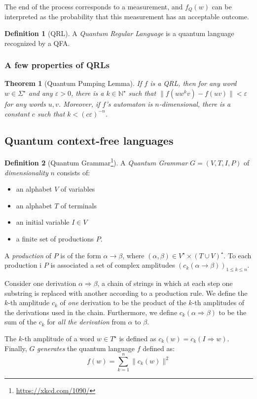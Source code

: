 \documentclass[12pt,a4paper]{article}
\theoremstyle{plain}
\newtheorem*{theorem}{Theorem}
\theoremstyle{definition}
\newtheorem*{definition}{Definition}
\begin{document}
The end of the process corresponds to a measurement, and $f_Q(w)$ can be interpreted as the probability that this measurement has an acceptable outcome. 

\begin{definition}[QRL]
    A \emph{Quantum Regular Language} is a quantum language recognized by a QFA.
\end{definition}

\subsubsection{A few properties of QRLs}
\begin{theorem}[Quantum Pumping Lemma]
    If $f$ is a QRL, then for any word $w\in\Sigma^\star$ and any $\varepsilon > 0$, there is a $k\in \mathbb{N}^\star$ such that $\|f(uw^kv) - f(uv)\| < \varepsilon$ for any words $u, v$. Moreover, if $f$'s automaton is $n$-dimensional, there is a constant $c$ such that $k < (c\varepsilon)^{-n}$.
\end{theorem}

\subsection{Quantum context-free languages}
\begin{definition}[Quantum Grammar\footnote{\url{https://xkcd.com/1090/}}]
    A \emph{Quantum Grammar} $G=(V, T, I, P)$ of \emph{dimensionality} $n$ consists of:
    \begin{itemize}[label=--, noitemsep]
        \item an alphabet $V$ of variables
        \item an alphabet $T$ of terminals
        \item an initial variable $I\in V$
        \item a finite set of productions $P$. 
    \end{itemize}
    A \emph{production} of $P$ is of the form $\alpha\to \beta$, where $(\alpha, \beta)\in V^\star\times (T\cup V)^\star$. To each production i $P$ is associated a set of complex amplitudes $\left(c_k(\alpha\to\beta)\right)_{1\leq k\leq n}$.

    Consider one derivation $\alpha\Rightarrow\beta$, a chain of strings in which at each step one substring is replaced with another according to a production rule. We define the $k$-th amplitude $c_k$ of \emph{one} derivation to be the product of the $k$-th amplitudes of the derivations used in the chain. Furthermore, we define $c_k(\alpha\Rightarrow\beta)$ to be the sum of the $c_k$ for \emph{all the derivation} from $\alpha$ to $\beta$.

    The $k$-th amplitude of a word $w\in T^\star$ is defined as $c_k(w) = c_k(I\Rightarrow w)$. Finally, $G$ \emph{generates} the quantum language $f$ defined as:
    \begin{equation*}
        f(w) = \sum_{k=1}^n \|c_k(w)\|^2
    \end{equation*}
\end{definition}
\end{document}
